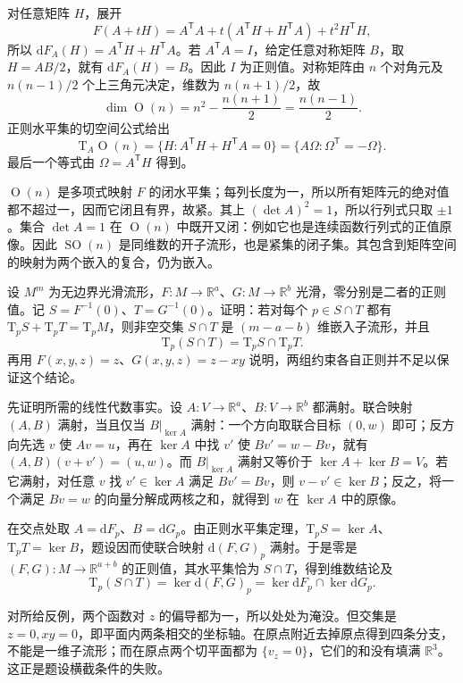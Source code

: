 \begin{solution}
	对任意矩阵 \(H\)，展开
	\[
		F(A+tH)=A^{\mathsf T}A+t(A^{\mathsf T}H+H^{\mathsf T}A)+t^2H^{\mathsf T}H,
	\]
	所以 \(\mathrm{d}F_A(H)=A^{\mathsf T}H+H^{\mathsf T}A\)。若 \(A^{\mathsf T}A=I\)，给定任意对称矩阵 \(B\)，取 \(H=AB/2\)，就有 \(\mathrm{d}F_A(H)=B\)。因此 \(I\) 为正则值。对称矩阵由 \(n\) 个对角元及 \(n(n-1)/2\) 个上三角元决定，维数为 \(n(n+1)/2\)，故
	\[
		\dim\operatorname{O}(n)=n^2-\frac{n(n+1)}2=\frac{n(n-1)}2.
	\]
	正则水平集的切空间公式给出
	\[
		\mathrm{T}_A\operatorname{O}(n)=\{H:A^{\mathsf T}H+H^{\mathsf T}A=0\}
		=\{A\Omega:\Omega^{\mathsf T}=-\Omega\}.
	\]
	最后一个等式由 \(\Omega=A^{\mathsf T}H\) 得到。

	\(\operatorname{O}(n)\) 是多项式映射 \(F\) 的闭水平集；每列长度为一，所以所有矩阵元的绝对值都不超过一，因而它闭且有界，故紧。其上 \((\det A)^2=1\)，所以行列式只取 \(\pm1\)。集合 \(\det A=1\) 在 \(\operatorname{O}(n)\) 中既开又闭：例如它也是连续函数行列式的正值原像。因此 \(\operatorname{SO}(n)\) 是同维数的开子流形，也是紧集的闭子集。其包含到矩阵空间的映射为两个嵌入的复合，仍为嵌入。
\end{solution}

\begin{exercise}\label{g1:ex:transverse-level-intersection}
	设 \(M^m\) 为无边界光滑流形，\(F:M\to\mathbb R^a\)、\(G:M\to\mathbb R^b\) 光滑，零分别是二者的正则值。记 \(S=F^{-1}(0)\)、\(T=G^{-1}(0)\)。证明：若对每个 \(p\in S\cap T\) 都有 \(\mathrm{T}_pS+\mathrm{T}_pT=\mathrm{T}_pM\)，则非空交集 \(S\cap T\) 是 \((m-a-b)\) 维嵌入子流形，并且
	\[
		\mathrm{T}_p(S\cap T)=\mathrm{T}_pS\cap \mathrm{T}_pT.
	\]
	再用 \(F(x,y,z)=z\)、\(G(x,y,z)=z-xy\) 说明，两组约束各自正则并不足以保证这个结论。
\end{exercise}
\begin{solution}
	先证明所需的线性代数事实。设 \(A:V\to\mathbb R^a\)、\(B:V\to\mathbb R^b\) 都满射。联合映射 \((A,B)\) 满射，当且仅当 \(B|_{\ker A}\) 满射：一个方向取联合目标 \((0,w)\) 即可；反方向先选 \(v\) 使 \(Av=u\)，再在 \(\ker A\) 中找 \(v'\) 使 \(Bv'=w-Bv\)，就有 \((A,B)(v+v')=(u,w)\)。而 \(B|_{\ker A}\) 满射又等价于 \(\ker A+\ker B=V\)。若它满射，对任意 \(v\) 找 \(v'\in\ker A\) 满足 \(Bv'=Bv\)，则 \(v-v'\in\ker B\)；反之，将一个满足 \(Bv=w\) 的向量分解成两核之和，就得到 \(w\) 在 \(\ker A\) 中的原像。

	在交点处取 \(A=\mathrm{d}F_p\)、\(B=\mathrm{d}G_p\)。由正则水平集定理，\(\mathrm{T}_pS=\ker A\)、\(\mathrm{T}_pT=\ker B\)，题设因而使联合映射 \(\mathrm{d}(F,G)_p\) 满射。于是零是 \((F,G):M\to\mathbb R^{a+b}\) 的正则值，其水平集恰为 \(S\cap T\)，得到维数结论及
	\[
		\mathrm{T}_p(S\cap T)=\ker\mathrm{d}(F,G)_p
		=\ker\mathrm{d}F_p\cap\ker\mathrm{d}G_p.
	\]

	对所给反例，两个函数对 \(z\) 的偏导都为一，所以处处为淹没。但交集是 \(z=0,xy=0\)，即平面内两条相交的坐标轴。在原点附近去掉原点得到四条分支，不能是一维子流形；而在原点两个切平面都为 \(\{v_z=0\}\)，它们的和没有填满 \(\mathbb R^3\)。这正是题设横截条件的失败。
\end{solution}

